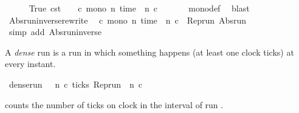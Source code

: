 \begin{isabellebody}
%
\isadelimproof
%
\endisadelimproof
%
\isatagproof
{}\isamarkupfalse%
\isanewline
\ \ \isamarkupfalse%
\ {\isacartoucheopen}{\isacharparenleft}{\isasymlambda}{\isacharunderscore}\ {\isacharunderscore}{\isachardot}\ {\isacharparenleft}True{\isacharcomma}\ {\isasymtau}\isactrlsub c\isactrlsub s\isactrlsub t\ {}{\isacharparenright}{\isacharparenright}\ {\isasymin}\ {\isacharbraceleft}{\isasymrho}{\isachardot}\ {\isasymforall}c{\isachardot}\ mono\ {\isacharparenleft}{\isasymlambda}n{\isachardot}\ time\ {\isacharparenleft}{\isasymrho}\ n\ c{\isacharparenright}{\isacharparenright}{\isacharbraceright}{\isacartoucheclose}\ \isanewline
\ \ \ \ \isamarkupfalse%
\ mono{\isacharunderscore}def\ \isamarkupfalse%
\ blast\isanewline
{}\isamarkupfalse%
%
\endisatagproof
{\isafoldproof}%
%
\isadelimproof
\isanewline
%
\endisadelimproof
\isanewline
{}\isamarkupfalse%
\ Abs{\isacharunderscore}run{\isacharunderscore}inverse{\isacharunderscore}rewrite{\isacharcolon}\isanewline
\ \ {\isacartoucheopen}{\isasymforall}c{\isachardot}\ mono\ {\isacharparenleft}{\isasymlambda}n{\isachardot}\ time\ {\isacharparenleft}{\isasymrho}\ n\ c{\isacharparenright}{\isacharparenright}\ {\isasymLongrightarrow}\ Rep{\isacharunderscore}run\ {\isacharparenleft}Abs{\isacharunderscore}run\ {\isasymrho}{\isacharparenright}\ {\isacharequal}\ {\isasymrho}{\isacartoucheclose}\isanewline
%
\isadelimproof
%
\endisadelimproof
%
\isatagproof
{}\isamarkupfalse%
\ {\isacharparenleft}simp\ add{\isacharcolon}\ Abs{\isacharunderscore}run{\isacharunderscore}inverse{\isacharparenright}%
\endisatagproof
{\isafoldproof}%
%
\isadelimproof
%
\endisadelimproof
%
\begin{isamarkuptext}%
A \emph{dense} run is a run in which something happens (at least one clock ticks) 
  at every instant.%
\end{isamarkuptext}\isamarkuptrue%
\isamarkupfalse%
\ {\isacartoucheopen}dense{\isacharunderscore}run\ {\isasymrho}\ {\isasymequiv}\ {\isacharparenleft}{\isasymforall}n{\isachardot}\ {\isasymexists}c{\isachardot}\ ticks\ {\isacharparenleft}{\isacharparenleft}Rep{\isacharunderscore}run\ {\isasymrho}{\isacharparenright}\ n\ c{\isacharparenright}{\isacharparenright}{\isacartoucheclose}%
\begin{isamarkuptext}%
 counts the number of ticks on clock  
  in the interval \isatt{[0{\char`\,}\ n]} of run \isa{{\isasymrho}}.%

\end{isamarkuptext}
\end{isabellebody}
